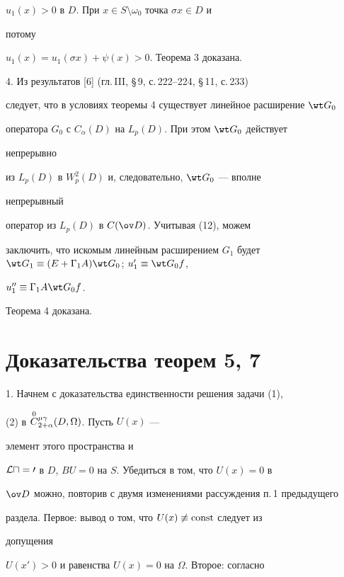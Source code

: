 $u_1(x)>0$ в $D$. При $x\in S\setminus\omega_0$ точка $\sigma x\in D$ и 


потому 


$u_1(x)=u_1(\sigma x)+\psi(x)>0$. Теорема 3 доказана. 


\medskip 


 


4. Из результатов [6] (гл.\,III, \S\,9, с.\,222--224, \S\,11, с.\,233) 


следует, что в условиях теоремы 4 существует линейное расширение $\wt 


G_0$ 


оператора $G_0$ с $C_\alpha(D)$ на $L_p(D)$. При этом $\wt G_0$ действует 


непрерывно 


из $L_p(D)$ в $W^2_p(D)$ и, следовательно, $\wt G_0$ --- вполне 


непрерывный 


оператор из $L_p(D)$ в $C(\ov D)$. Учитывая (12), можем 


заключить, что искомым линейным расширением $G_1$ будет $\wt 


G_1\equiv(E+\Gamma_1A)\wt G_0$; $u'_1\equiv\wt G_0f$, 


$u''_1\equiv\Gamma_1A\wt G_0f$. 


Теорема 4 доказана. 


 


\section{Доказательства теорем 5, 7} 


 


1. Начнем с доказательства единственности решения задачи (1), 


(2) в $\overset{0}{C}{}^{\mu\gamma}_{2+\alpha}(D,\Omega)$. Пусть $U(x)$ --- 


элемент этого пространства и 


$\cal L u=0$ в $D$, $B U=0$ на $S$. Убедиться в том, что $U(x)=0$ в 


$\ov D$ можно, повторив с двумя изменениями рассуждения п.\,1 предыдущего 


раздела. Первое: вывод о том, что $U(x)\not\equiv\operatorname{const}$ следует из 


допущения 


$U(x')>0$ и равенства $U(x)=0$ на $\Omega$. Второе: согласно 



